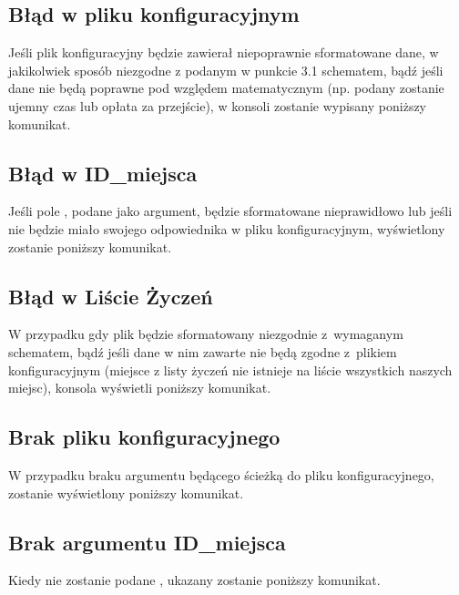 \documentclass[12pt,a4paper]{article}
\begin{document}
\subsection{Błąd w pliku konfiguracyjnym}
Jeśli plik konfiguracyjny będzie zawierał niepoprawnie sformatowane dane, w jakikolwiek sposób niezgodne z podanym w punkcie 3.1 schematem, bądź jeśli dane nie będą poprawne pod względem matematycznym (np. podany zostanie ujemny czas lub opłata za przejście), w konsoli zostanie wypisany poniższy komunikat.\\
{\footnotesize{}}
\subsection{Błąd w ID\_miejsca}
Jeśli pole , podane jako argument, będzie sformatowane nieprawidłowo lub jeśli nie będzie miało swojego odpowiednika w pliku konfiguracyjnym, wyświetlony zostanie poniższy komunikat.\\
\subsection{Błąd w Liście Życzeń}
W przypadku gdy plik  będzie sformatowany niezgodnie z~wymaganym schematem, bądź jeśli dane w nim zawarte nie będą zgodne z~plikiem konfiguracyjnym (miejsce z listy życzeń nie istnieje na liście wszystkich naszych miejsc), konsola wyświetli poniższy komunikat.\\
\subsection{Brak pliku konfiguracyjnego}
W przypadku braku argumentu będącego ścieżką do pliku konfiguracyjnego, zostanie wyświetlony poniższy komunikat.\\
\subsection{Brak argumentu ID\_miejsca}
Kiedy nie zostanie podane , ukazany zostanie poniższy komunikat.\\
\end{document}

